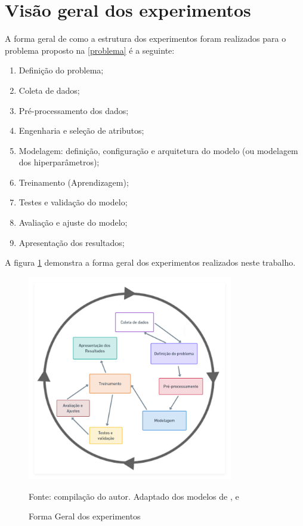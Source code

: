 \section{Visão geral dos experimentos}\label{forma_geral_experimentos}
A forma geral de como a estrutura dos experimentos foram realizados para o problema proposto na \autoref{problema} é a seguinte:
\begin{enumerate}
	\item Definição do problema;
	\item Coleta de dados;
	\item Pré-processamento dos dados;
	\item Engenharia e seleção de atributos;
	\item Modelagem: definição, configuração e arquitetura do modelo (ou modelagem dos hiperparâmetros);
	\item Treinamento (Aprendizagem);
	\item Testes e validação do modelo;
	\item Avaliação e ajuste do modelo;
	\item Apresentação dos resultados;
\end{enumerate}

A figura \ref{fig:metodologia} demonstra a forma geral dos experimentos realizados neste trabalho.

\begin{figure}[!h]
	\centering
	\caption{Forma Geral dos experimentos}
	\includegraphics[width=0.8\textwidth]{imagens/metodologia3.png}	
	
	\label{fig:metodologia}
	{\scriptsize Fonte: compilação do autor. Adaptado dos modelos de ,  e }
\end{figure}



